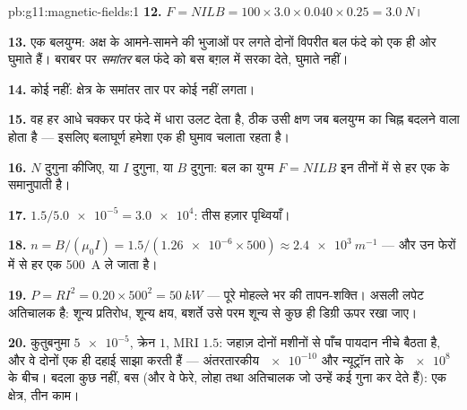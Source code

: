 \begin{solution}{pb:g11:magnetic-fields:1}
\textbf{12.} $F = NILB = 100 \times 3.0 \times 0.040 \times 0.25 =
\qty{3.0}{N}$।

\textbf{13.} एक बलयुग्म: अक्ष के आमने-सामने की भुजाओं पर लगते दोनों विपरीत
बल फंदे को एक ही ओर घुमाते हैं। बराबर पर \emph{समांतर} बल
फंदे को बस बग़ल में सरका देते, घुमाते नहीं।

\textbf{14.} कोई नहीं: क्षेत्र के समांतर तार पर कोई  नहीं लगता।

\textbf{15.} वह हर आधे चक्कर पर फंदे में धारा उलट देता है, ठीक उसी क्षण जब
बलयुग्म का चिह्न बदलने वाला होता है --- इसलिए बलाघूर्ण हमेशा एक ही घुमाव
चलाता रहता है।

\textbf{16.} $N$ दुगुना कीजिए, या $I$ दुगुना, या $B$ दुगुना:
बल का युग्म $F = NILB$ इन तीनों में से हर एक के समानुपाती है।

\textbf{17.} $1.5 / \num{5.0e-5} = \num{3.0e4}$: तीस हज़ार पृथ्वियाँ।

\textbf{18.} $n = B/(\mu_0 I) = 1.5 / (\num{1.26e-6} \times 500)
\approx \qty{2.4e3}{m^{-1}}$ --- और उन फेरों में से हर एक \qty{500}{A} ले जाता है।

\textbf{19.} $P = RI^2 = 0.20 \times 500^2 = \qty{50}{kW}$ --- पूरे मोहल्ले भर की तापन-शक्ति। असली लपेट अतिचालक है:
शून्य प्रतिरोध, शून्य क्षय, बशर्ते उसे परम शून्य से कुछ ही डिग्री
ऊपर रखा जाए।

\textbf{20.} कुतुबनुमा $\num{5e-5}$, क्रेन $1$, MRI $1.5$: जहाज़ दोनों
मशीनों से पाँच पायदान नीचे बैठता है, और वे दोनों एक ही दहाई साझा करती हैं ---
अंतरतारकीय $\num{e-10}$ और न्यूट्रॉन तारे के $\num{e8}$ के बीच। बदला कुछ नहीं, बस
 (और वे फेरे, लोहा तथा अतिचालक जो उन्हें कई गुना कर देते हैं):
एक क्षेत्र, तीन काम।
\end{solution}
